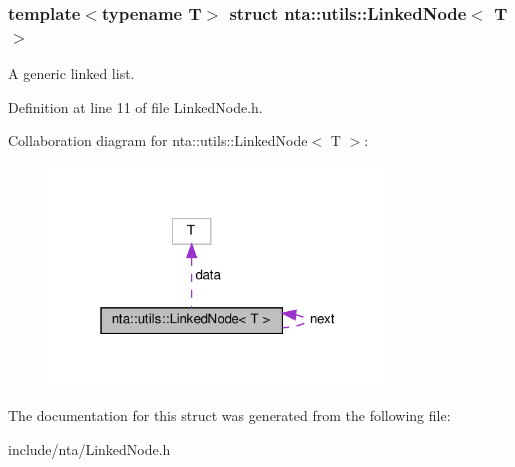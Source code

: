 \subsubsection*{template$<$typename T$>$\newline
struct nta\+::utils\+::\+Linked\+Node$<$ T $>$}

A generic linked list. 

Definition at line 11 of file Linked\+Node.\+h.



Collaboration diagram for nta\+:\+:utils\+:\+:Linked\+Node$<$ T $>$\+:
\nopagebreak
\begin{figure}[H]
\begin{center}
\leavevmode
\includegraphics[width=256pt]{d8/d8c/structnta_1_1utils_1_1LinkedNode__coll__graph}
\end{center}
\end{figure}


The documentation for this struct was generated from the following file\+:\begin{DoxyCompactItemize}
\item 
include/nta/Linked\+Node.\+h\end{DoxyCompactItemize}
